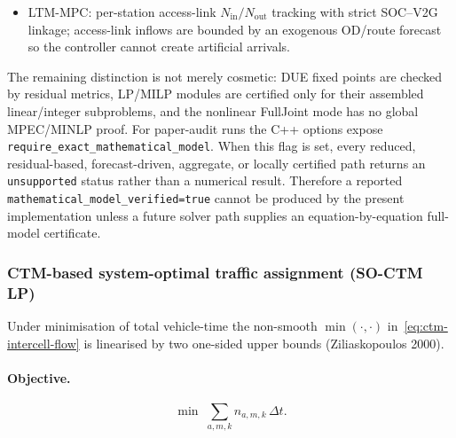 \begin{remark}
\begin{itemize}
          availability constraints inside the MILP.
    \item LTM-MPC: per-station access-link $N_{\text{in}}/N_{\text{out}}$
          tracking with strict SOC--V2G linkage; access-link inflows are
          bounded by an exogenous OD/route forecast so the controller cannot
          create artificial arrivals.
  \end{itemize}
  The remaining distinction is not merely cosmetic: DUE fixed points are
  checked by residual metrics, LP/MILP modules are certified only for their
  assembled linear/integer subproblems, and the nonlinear FullJoint mode has no
  global MPEC/MINLP proof.
  For paper-audit runs the C++ options expose
  \texttt{require\_exact\_mathematical\_model}.  When this flag is set, every
  reduced, residual-based, forecast-driven, aggregate, or locally certified
  path returns an \texttt{unsupported} status rather than a numerical result.
  Therefore a reported \texttt{mathematical\_model\_verified=true} cannot be
  produced by the present implementation unless a future solver path supplies
  an equation-by-equation full-model certificate.
\end{remark}

\subsubsection{CTM-based system-optimal traffic assignment (SO-CTM LP)}
\label{sec:traffic-ctm-so-lp}

Under minimisation of total vehicle-time the non-smooth $\min(\cdot,\cdot)$
in~\eqref{eq:ctm-intercell-flow} is linearised by two one-sided upper bounds
(Ziliaskopoulos 2000).

\paragraph{Objective.}
\begin{equation}
  \min\; \sum_{a,m,k} n_{a,m,k}\,\Delta t.
  \label{eq:so-ctm-obj}
\end{equation}

